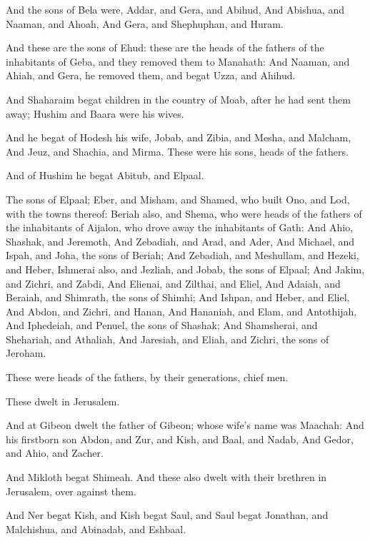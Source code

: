 \verse And the sons of Bela were, Addar, and Gera, and Abihud, \verse And Abishua, and Naaman, and Ahoah, \verse And Gera, and Shephuphan, and Huram.

\verse And these are the sons of Ehud: these are the heads of the fathers of the inhabitants of Geba, and they removed them to Manahath: \verse And Naaman, and Ahiah, and Gera, he removed them, and begat Uzza, and Ahihud.

\verse And Shaharaim begat children in the country of Moab, after he had sent them away; Hushim and Baara were his wives.

\verse And he begat of Hodesh his wife, Jobab, and Zibia, and Mesha, and Malcham, \verse And Jeuz, and Shachia, and Mirma. These were his sons, heads of the fathers.

\verse And of Hushim he begat Abitub, and Elpaal.

\verse The sons of Elpaal; Eber, and Misham, and Shamed, who built Ono, and Lod, with the towns thereof: \verse Beriah also, and Shema, who were heads of the fathers of the inhabitants of Aijalon, who drove away the inhabitants of Gath: \verse And Ahio, Shashak, and Jeremoth, \verse And Zebadiah, and Arad, and Ader, \verse And Michael, and Ispah, and Joha, the sons of Beriah; \verse And Zebadiah, and Meshullam, and Hezeki, and Heber, \verse Ishmerai also, and Jezliah, and Jobab, the sons of Elpaal; \verse And Jakim, and Zichri, and Zabdi, \verse And Elienai, and Zilthai, and Eliel, \verse And Adaiah, and Beraiah, and Shimrath, the sons of Shimhi; \verse And Ishpan, and Heber, and Eliel, \verse And Abdon, and Zichri, and Hanan, \verse And Hananiah, and Elam, and Antothijah, \verse And Iphedeiah, and Penuel, the sons of Shashak; \verse And Shamsherai, and Shehariah, and Athaliah, \verse And Jaresiah, and Eliah, and Zichri, the sons of Jeroham.

\verse These were heads of the fathers, by their generations, chief men.

These dwelt in Jerusalem.

\verse And at Gibeon dwelt the father of Gibeon; whose wife's name was Maachah: \verse And his firstborn son Abdon, and Zur, and Kish, and Baal, and Nadab, \verse And Gedor, and Ahio, and Zacher.

\verse And Mikloth begat Shimeah. And these also dwelt with their brethren in Jerusalem, over against them.

\verse And Ner begat Kish, and Kish begat Saul, and Saul begat Jonathan, and Malchishua, and Abinadab, and Eshbaal.


